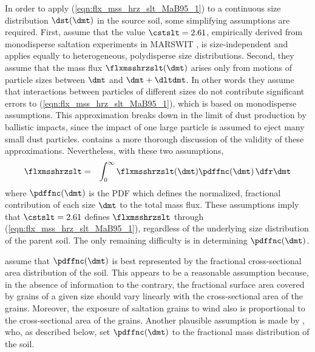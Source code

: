 \documentclass[12pt,twoside]{book}
\begin{document}
In order to apply (\ref{eqn:flx_mss_hrz_slt_MaB95_1}) to a continuous 
size distribution $\dst(\dmt)$ in the source soil, some simplifying
assumptions are required.
First, \cite{MaB95} assume that the value $\cstslt = 2.61$,
empirically derived from monodisperse saltation experiments in MARSWIT 
\cite[]{Whi79}, is size-independent and applies equally to
heterogeneous, polydisperse size distributions.
Second, they assume that the mass flux $\flxmsshrzslt(\dmt)$ arises
only from motions of particle sizes between $\dmt$ and $\dmt +
\dltdmt$. 
In other words they assume that interactions between particles of
different sizes do not contribute significant errors to
(\ref{eqn:flx_mss_hrz_slt_MaB95_1}), which is based on monodisperse
assumptions.
This approximation breaks down in the limit of dust production by
ballistic impacts, since the impact of one large particle is assumed
to eject many small dust particles.  
\cite{SRL96}  contains a more thorough discussion of the
validity of these approximations.
Nevertheless, with these two assumptions, 
\begin{eqnarray}
\flxmsshrzslt & = & \int_{0}^{\infty} \flxmsshrzslt(\dmt)
\pdffnc(\dmt) \,\dfr\dmt
\label{eqn:flx_mss_hrz_slt_MaB95_2}
\end{eqnarray}
where $\pdffnc(\dmt)$ is the PDF which defines the normalized,
fractional contribution of each size $\dmt$ to the total mass flux. 
These assumptions imply that $\cstslt = 2.61$ defines $\flxmsshrzslt$
through (\ref{eqn:flx_mss_hrz_slt_MaB95_1}), regardless of the
underlying size distribution of the parent soil. 
The only remaining difficulty is in determining $\pdffnc(\dmt)$.

\cite{MaB95} assume that $\pdffnc(\dmt)$ is best represented by the
fractional cross-sectional area distribution of the soil. 
This appears to be a reasonable assumption because, in the absence of
information to the contrary, the fractional surface area covered by
grains of a given size should vary linearly with the cross-sectional
area of the grains.  
Moreover, the exposure of saltation grains to wind also is
proportional to the cross-sectional area of the grains.
Another plausible assumption is made by \cite{SRL96}, who, as
described below, set $\pdffnc(\dmt)$ to the fractional mass
distribution of the soil.
\end{document}
